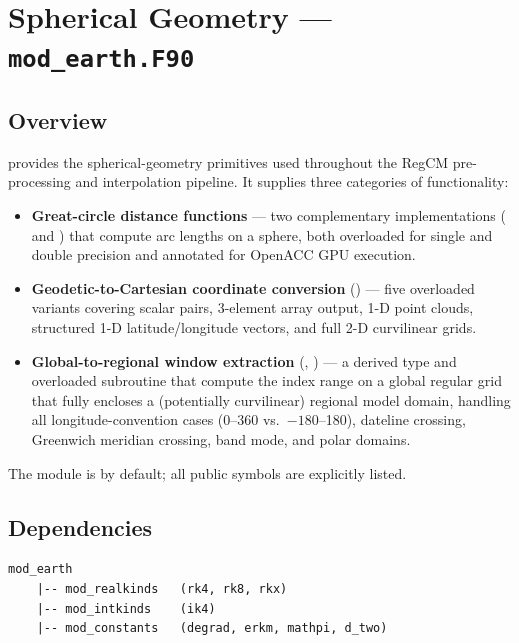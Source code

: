 \section{Spherical Geometry --- \texttt{mod\_earth.F90}}
\label{sec:earth}

\subsection{Overview}

 provides the spherical-geometry primitives used throughout
the RegCM pre-processing and interpolation pipeline. It supplies three
categories of functionality:

\begin{itemize}
  \item \textbf{Great-circle distance functions} --- two complementary
        implementations ( and ) that
        compute arc lengths on a sphere, both overloaded for single and
        double precision and annotated for OpenACC GPU execution.
  \item \textbf{Geodetic-to-Cartesian coordinate conversion} ()
        --- five overloaded variants covering scalar pairs, 3-element array
        output, 1-D point clouds, structured 1-D latitude/longitude vectors,
        and full 2-D curvilinear grids.
  \item \textbf{Global-to-regional window extraction} (,
        ) --- a derived type and overloaded subroutine
        that compute the index range on a global regular grid that fully
        encloses a (potentially curvilinear) regional model domain, handling
        all longitude-convention cases (0--360 vs.\ $-180$--180), dateline
        crossing, Greenwich meridian crossing, band mode, and polar domains.
\end{itemize}

The module is  by default; all public symbols are explicitly
listed.

\subsection{Dependencies}

\begin{lstlisting}
mod_earth
    |-- mod_realkinds   (rk4, rk8, rkx)
    |-- mod_intkinds    (ik4)
    |-- mod_constants   (degrad, erkm, mathpi, d_two)
\end{lstlisting}

